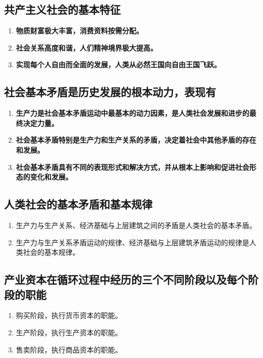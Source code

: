 \documentclass[12pt, a4paper, oneside]{ctexbook}
\begin{document}
\subsection{共产主义社会的基本特征}

\begin{enumerate}
\item \textbf{物质财富极大丰富，消费资料按需分配。}
\item \textbf{社会关系高度和谐，人们精神境界极大提高。}
\item \textbf{实现每个人自由而全面的发展，人类从必然王国向自由王国飞跃。}
\end{enumerate}

\subsection{社会基本矛盾是历史发展的根本动力，表现有}

\begin{enumerate}
\item \textbf{生产力是社会基本矛盾运动中最基本的动力因素，是人类社会发展和进步的最终决定力量。}
\item \textbf{社会基本矛盾特别是生产力和生产关系的矛盾，决定着社会中其他矛盾的存在和发展。}
\item \textbf{社会基本矛盾具有不同的表现形式和解决方式，并从根本上影响和促进社会形态的变化和发展。}
\end{enumerate}

\subsection{人类社会的基本矛盾和基本规律}

\begin{enumerate}
\item 生产力与生产关系、经济基础与上层建筑之间的矛盾是人类社会的基本矛盾。
\item 生产力与生产关系矛盾运动的规律、经济基础与上层建筑矛盾运动的规律是人类社会的基本规律。
\end{enumerate}

\subsection{产业资本在循环过程中经历的三个不同阶段以及每个阶段的职能}

\begin{enumerate}
\item 购买阶段，执行货币资本的职能。
\item 生产阶段，执行生产资本的职能。
\item 售卖阶段，执行商品资本的职能。
\end{enumerate}
\end{document}
